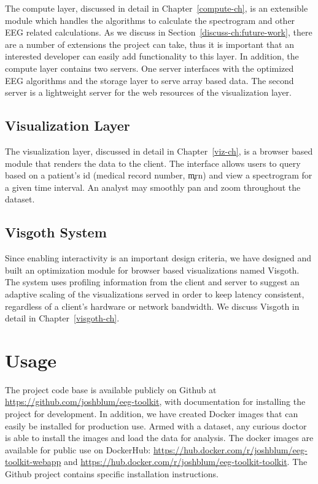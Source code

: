 The compute layer, discussed in detail in Chapter~\ref{compute-ch}, is an
extensible module which handles the algorithms to calculate the spectrogram and
other EEG related calculations. As we discuss in
Section~\ref{discuss-ch:future-work}, there are a number of extensions the
project can take, thus it is important that an interested developer can easily
add functionality to this layer. In addition, the compute layer contains two
servers. One server interfaces with the optimized EEG algorithms and the
storage layer to serve array based data. The second server is a lightweight
server for the web resources of the visualization layer.

\subsection{Visualization Layer}

The visualization layer, discussed in detail in Chapter~\ref{viz-ch}, is a browser
based module that renders the data to the client. The interface allows users to
query based on a patient's id (medical record number, \c{mrn}) and view a spectrogram
for a given time interval. An analyst may smoothly pan and zoom throughout the dataset.

\subsection{Visgoth System}

Since enabling interactivity is an important design criteria, we have designed
and built an optimization module for browser based visualizations named
Visgoth. The system uses profiling information from the client and server to
suggest an adaptive scaling of the visualizations served in order to keep
latency consistent, regardless of a client's hardware or network bandwidth. We
discuss Visgoth in detail in Chapter~\ref{visgoth-ch}.

\section{Usage}

The project code base is available publicly on Github \cite{github} at
\url{https://github.com/joshblum/eeg-toolkit}, with documentation for
installing the project for development. In addition, we have created Docker
\cite{docker} images that can easily be installed for production use. Armed
with a dataset, any curious doctor is able to install the images and load the
data for analysis. The docker images are available for public use on DockerHub:
\url{https://hub.docker.com/r/joshblum/eeg-toolkit-webapp} and
\url{https://hub.docker.com/r/joshblum/eeg-toolkit-toolkit}. The Github project
contains specific installation instructions.

